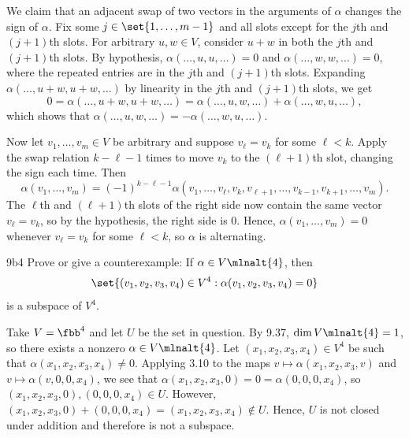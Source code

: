 \begin{sol}
    We claim that an adjacent swap of two vectors in the arguments of $\alpha$ changes the sign of $\alpha$.
    Fix some $j \in \set{1, \ldots, m - 1}$ and all slots except for the $j$th and $(j+1)$th slots.
    For arbitrary $u, w \in V$, consider $u + w$ in both the $j$th and $(j+1)$th slots.
    By hypothesis, $\alpha(\ldots, u, u, \ldots) = 0$ and $\alpha(\ldots, w, w, \ldots) = 0$, where the repeated entries are in the $j$th and $(j+1)$th slots.
    Expanding $\alpha(\ldots, u + w, u + w, \ldots)$ by linearity in the $j$th and $(j+1)$th slots, we get
    \[
        0 = \alpha(\ldots, u + w, u + w, \ldots) = \alpha(\ldots, u, w, \ldots) + \alpha(\ldots, w, u, \ldots),
    \]
    which shows that $\alpha(\ldots, u, w, \ldots) = -\alpha(\ldots, w, u, \ldots)$.

    Now let $v_1, \ldots, v_m \in V$ be arbitrary and suppose $v_\ell = v_k$ for some $\ell < k$.
    Apply the swap relation $k-\ell-1$ times to move $v_k$ to the $(\ell+1)$th slot, changing the sign each time.
    Then
    \[
        \alpha(v_1, \ldots, v_m) = (-1)^{k-\ell-1} \alpha(v_1, \ldots, v_\ell, v_k, v_{\ell+1}, \ldots, v_{k-1}, v_{k+1}, \ldots, v_m).
    \]
    The $\ell$th and $(\ell+1)$th slots of the right side now contain the same vector $v_\ell = v_k$, so by the hypothesis, the right side is $0$.
    Hence, $\alpha(v_1, \ldots, v_m) = 0$ whenever $v_\ell = v_k$ for some $\ell < k$, so $\alpha$ is alternating.
\end{sol}

\begin{exercise}{9b4}
    Prove or give a counterexample: If $\alpha \in V\mlnalt{4}$, then
    \[
        \set{(v_1, v_2, v_3, v_4) \in V^4 : \alpha(v_1, v_2, v_3, v_4) = 0}
    \]
    is a subspace of $V^4$.
\end{exercise}

\begin{sol}
    Take $V = \fbb^4$ and let $U$ be the set in question.
    By 9.37, $\dim V\mlnalt{4} = 1$, so there exists a nonzero $\alpha \in V\mlnalt{4}$.
    Let $(x_1, x_2, x_3, x_4) \in V^4$ be such that $\alpha(x_1, x_2, x_3, x_4) \neq 0$.
    Applying 3.10 to the maps $v \mapsto \alpha(x_1, x_2, x_3, v)$ and $v \mapsto \alpha(v, 0, 0, x_4)$, we see that $\alpha(x_1, x_2, x_3, 0) = 0 = \alpha(0, 0, 0, x_4)$, so $(x_1, x_2, x_3, 0), (0, 0, 0, x_4) \in U$.
    However, $(x_1, x_2, x_3, 0) + (0, 0, 0, x_4) = (x_1, x_2, x_3, x_4) \notin U$.
    Hence, $U$ is not closed under addition and therefore is not a subspace.
\end{sol}

